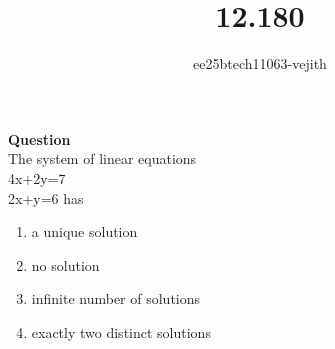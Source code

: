 \documentclass[journal]{IEEEtran}
\begin{document}

\vspace{3cm}

\title{12.180}
\author{ee25btech11063-vejith}

\maketitle
{\let\newpage\relax\maketitle}
\renewcommand{\thefigure}{\theenumi}
\renewcommand{\thetable}{\theenumi}
\setlength{\intextsep}{10pt} %
\textbf{Question}\\
The system of linear equations\\
\hspace*{3cm}4x+2y=7\\
\hspace*{3cm}2x+y=6  has 
\begin{multicols}{2}
\begin{enumerate}[label=\alph*)]
    \item a  unique solution
    \item no solution
    \item infinite number of solutions
    \item exactly two distinct solutions 
\end{enumerate}
\end{multicols}
\end{document}
